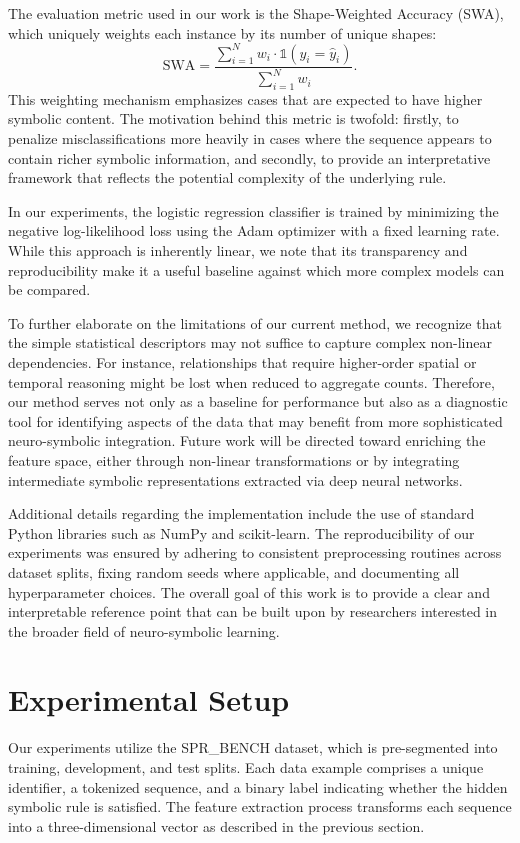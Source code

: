 \documentclass{article}
\begin{document}
The evaluation metric used in our work is the Shape-Weighted Accuracy (SWA), which uniquely weights each instance by its number of unique shapes:
\[
\text{SWA} = \frac{\sum_{i=1}^{N} w_i \cdot \mathbb{1}(y_i = \hat{y}_i)}{\sum_{i=1}^{N} w_i}.
\]
This weighting mechanism emphasizes cases that are expected to have higher symbolic content. The motivation behind this metric is twofold: firstly, to penalize misclassifications more heavily in cases where the sequence appears to contain richer symbolic information, and secondly, to provide an interpretative framework that reflects the potential complexity of the underlying rule.

In our experiments, the logistic regression classifier is trained by minimizing the negative log-likelihood loss using the Adam optimizer with a fixed learning rate. While this approach is inherently linear, we note that its transparency and reproducibility make it a useful baseline against which more complex models can be compared.

To further elaborate on the limitations of our current method, we recognize that the simple statistical descriptors may not suffice to capture complex non-linear dependencies. For instance, relationships that require higher-order spatial or temporal reasoning might be lost when reduced to aggregate counts. Therefore, our method serves not only as a baseline for performance but also as a diagnostic tool for identifying aspects of the data that may benefit from more sophisticated neuro-symbolic integration. Future work will be directed toward enriching the feature space, either through non-linear transformations or by integrating intermediate symbolic representations extracted via deep neural networks.

Additional details regarding the implementation include the use of standard Python libraries such as NumPy and scikit-learn. The reproducibility of our experiments was ensured by adhering to consistent preprocessing routines across dataset splits, fixing random seeds where applicable, and documenting all hyperparameter choices. The overall goal of this work is to provide a clear and interpretable reference point that can be built upon by researchers interested in the broader field of neuro-symbolic learning.

\section{Experimental Setup}
Our experiments utilize the SPR\_BENCH dataset, which is pre-segmented into training, development, and test splits. Each data example comprises a unique identifier, a tokenized sequence, and a binary label indicating whether the hidden symbolic rule is satisfied. The feature extraction process transforms each sequence into a three-dimensional vector as described in the previous section.
\end{document}
